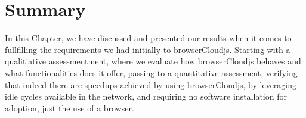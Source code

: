 \section{Summary}

In this Chapter, we have discussed and presented our results when it comes to fullfilling the requirements we had initially to browserCloudjs. Starting with a qualitiative assessmentment, where we evaluate how browserCloudjs behaves and what functionalities does it offer, passing to a quantitative assessment, verifying that indeed there are speedups achieved by using browserCloudjs, by leveraging idle cycles available in the network, and requiring no software installation for adoption, just the use of a browser.
